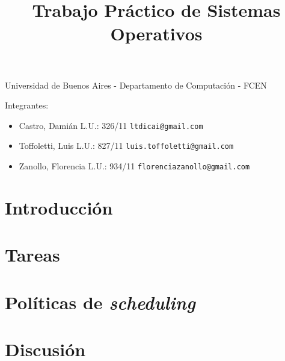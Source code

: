 \documentclass[a4paper,11pt]{article}
\title{Trabajo Práctico de Sistemas Operativos}
\begin{document}
\maketitle

\begin{center}
	Universidad de Buenos Aires - Departamento de Computaci\'on - FCEN
\end{center}


\vspace{2cm}
Integrantes:

\begin{itemize}
	\item Castro, Dami\'an L.U.: 326/11  \verb+ltdicai@gmail.com+
	\item Toffoletti, Luis L.U.: 827/11 \verb+luis.toffoletti@gmail.com+
	\item Zanollo, Florencia L.U.: 934/11 \verb+florenciazanollo@gmail.com+
\end{itemize}

\newpage

\tableofcontents

\newpage

\section{Introducción}


\section{Tareas}





\newpage





\newpage



\newpage

\section{Pol\'iticas de \emph{scheduling}}


\newpage 



\newpage



\newpage



\section{Discusi\'on}






\end{document}
